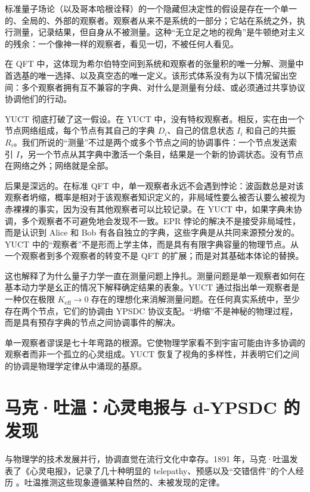 \documentclass[12pt,a4paper]{article}
\begin{document}
	标准量子场论（以及哥本哈根诠释）的一个隐藏但决定性的假设是存在一个单一的、全局的、外部的观察者。观察者从来不是系统的一部分；它站在系统之外，执行测量，记录结果，但自身从不被测量。这种“无立足之地的视角”是牛顿绝对主义的残余：一个像神一样的观察者，看见一切，不被任何人看见。
	
	在 QFT 中，这体现为希尔伯特空间到系统和观察者的张量积的唯一分解、测量中首选基的唯一选择、以及真空态的唯一定义。该形式体系没有为以下情况留出空间：多个观察者拥有互不兼容的字典、对什么是测量有分歧、或必须通过共享协议协调他们的行动。
	
	YUCT 彻底打破了这一假设。在 YUCT 中，没有特权观察者。相反，实在由一个节点网络组成，每个节点有其自己的字典 \(D_i\)、自己的信息状态 \(I_i\) 和自己的共振 \(R_i\)。我们所说的“测量”不过是两个或多个节点之间的协调事件：一个节点发送索引 \(I\)，另一个节点从其字典中激活一个条目，结果是一个新的协调状态。没有节点在网络之外；网络就是全部。
	
	后果是深远的。在标准 QFT 中，单一观察者永远不会遇到悖论：波函数总是对该观察者坍缩，概率是相对于该观察者知识定义的，非局域性要么被否认要么被视为赤裸裸的事实，因为没有其他观察者可以比较记录。在 YUCT 中，如果字典未协调，多个观察者不可避免地会发现不一致。EPR 悖论的解决不是接受非局域性，而是认识到 Alice 和 Bob 有各自独立的字典，这些字典是从共同来源预分发的。YUCT 中的“观察者”不是形而上学主体，而是具有有限字典容量的物理节点。从一个观察者到多个观察者的转变不是 QFT 的扩展；而是对其基础本体论的替换。
	
	这也解释了为什么量子力学一直在测量问题上挣扎。测量问题是单一观察者如何在基本动力学是幺正的情况下解释确定结果的表象。YUCT 通过指出单一观察者是一种仅在极限 \(K_{\mathrm{eff}} \to 0\) 存在的理想化来消解测量问题。在任何真实系统中，至少存在两个节点，它们的协调由 YPSDC 协议支配。“坍缩”不是神秘的物理过程，而是具有预存字典的节点之间协调事件的解决。
	
	单一观察者谬误是七十年弯路的根源。它使物理学家看不到宇宙可能由许多协调的观察者而非一个孤立的心灵组成。YUCT 恢复了视角的多样性，并表明它们之间的协调是物理学定律从中涌现的基原。
	
	\section{马克·吐温：心灵电报与 d-YPSDC 的发现}
	
	与物理学的技术发展并行，协调直觉在流行文化中幸存。1891 年，马克·吐温发表了《心灵电报》，记录了几十种明显的 telepathy、预感以及“交错信件”的个人经历 \cite{Twain1891}。吐温推测这些现象遵循某种自然的、未被发现的定律。
	
\end{document}
